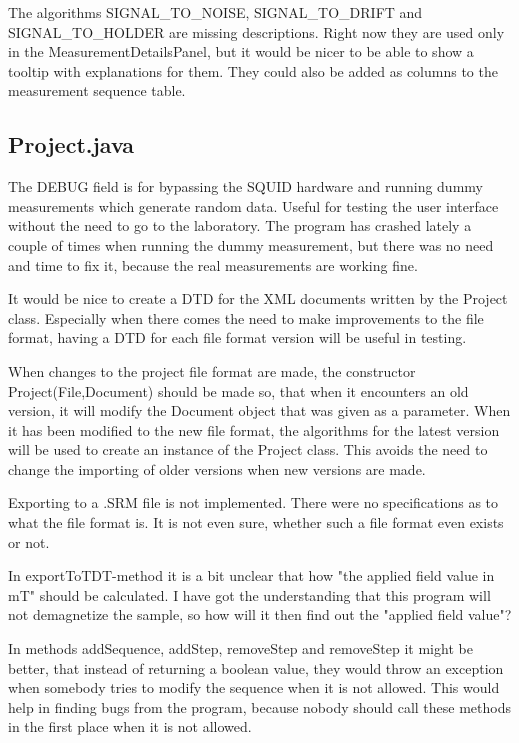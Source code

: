 The algorithms SIGNAL\_TO\_NOISE, SIGNAL\_TO\_DRIFT and SIGNAL\_TO\_HOLDER are missing descriptions. Right now they are used only in the MeasurementDetailsPanel, but it would be nicer to be able to show a tooltip with explanations for them. They could also be added as columns to the measurement sequence table.


\subsection{Project.java}

The DEBUG field is for bypassing the SQUID hardware and running dummy measurements which generate random data. Useful for testing the user interface without the need to go to the laboratory. The program has crashed lately a couple of times when running the dummy measurement, but there was no need and time to fix it, because the real measurements are working fine.

It would be nice to create a DTD for the XML documents written by the Project class. Especially when there comes the need to make improvements to the file format, having a DTD for each file format version will be useful in testing.

When changes to the project file format are made, the constructor Project(File,Document) should be made so, that when it encounters an old version, it will modify the Document object that was given as a parameter. When it has been modified to the new file format, the algorithms for the latest version will be used to create an instance of the Project class. This avoids the need to change the importing of older versions when new versions are made.

Exporting to a .SRM file is not implemented. There were no specifications as to what the file format is. It is not even sure, whether such a file format even exists or not.

In exportToTDT-method it is a bit unclear that how "the applied field value in mT" should be calculated. I have got the understanding that this program will not demagnetize the sample, so how will it then find out the "applied field value"?

In methods addSequence, addStep, removeStep and removeStep it might be better, that instead of returning a boolean value, they would throw an exception when somebody tries to modify the sequence when it is not allowed. This would help in finding bugs from the program, because nobody should call these methods in the first place when it is not allowed.

